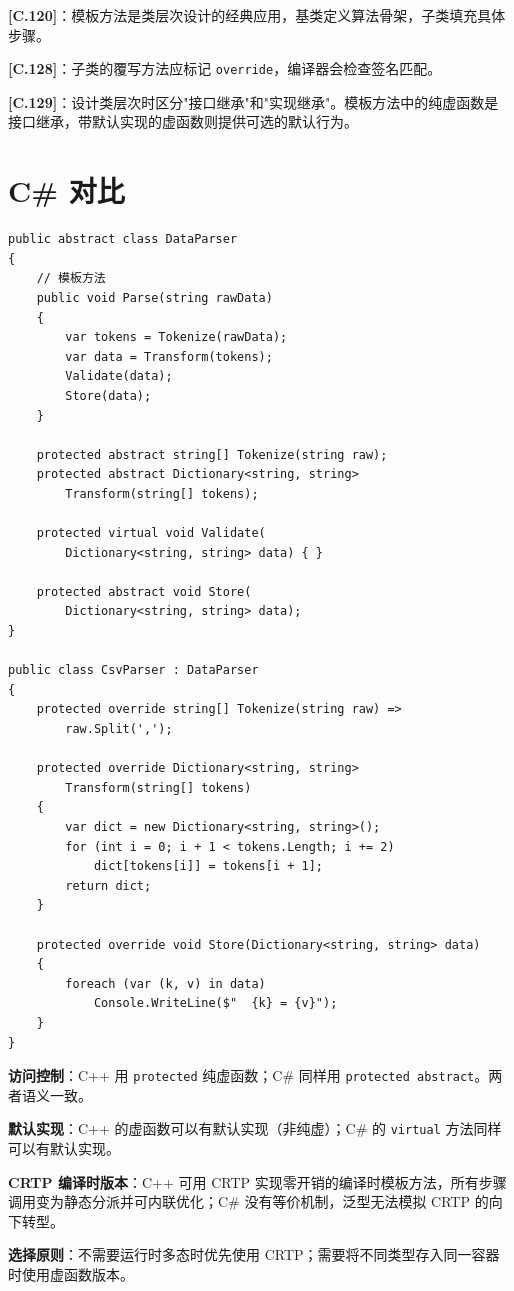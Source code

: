 \documentclass[12pt,a4paper,fontset=fandol]{ctexbook}
\newcommand{\guideref}[1]{\textbf{\textcolor{blue!70!black}{[#1]}}}
\begin{document}
\begin{guideline}
\guideref{C.120}：模板方法是类层次设计的经典应用，基类定义算法骨架，子类填充具体步骤。

\guideref{C.128}：子类的覆写方法应标记 \texttt{override}，编译器会检查签名匹配。

\guideref{C.129}：设计类层次时区分"接口继承"和"实现继承"。模板方法中的纯虚函数是接口继承，带默认实现的虚函数则提供可选的默认行为。
\end{guideline}

\section{C\# 对比}

\begin{lstlisting}[style=csharpstyle, caption={模板方法模式 --- C\# 实现}]
public abstract class DataParser
{
    // 模板方法
    public void Parse(string rawData)
    {
        var tokens = Tokenize(rawData);
        var data = Transform(tokens);
        Validate(data);
        Store(data);
    }

    protected abstract string[] Tokenize(string raw);
    protected abstract Dictionary<string, string>
        Transform(string[] tokens);

    protected virtual void Validate(
        Dictionary<string, string> data) { }

    protected abstract void Store(
        Dictionary<string, string> data);
}

public class CsvParser : DataParser
{
    protected override string[] Tokenize(string raw) =>
        raw.Split(',');

    protected override Dictionary<string, string>
        Transform(string[] tokens)
    {
        var dict = new Dictionary<string, string>();
        for (int i = 0; i + 1 < tokens.Length; i += 2)
            dict[tokens[i]] = tokens[i + 1];
        return dict;
    }

    protected override void Store(Dictionary<string, string> data)
    {
        foreach (var (k, v) in data)
            Console.WriteLine($"  {k} = {v}");
    }
}
\end{lstlisting}

\begin{compare}
\textbf{访问控制}：C++ 用 \texttt{protected} 纯虚函数；C\# 同样用 \texttt{protected abstract}。两者语义一致。

\textbf{默认实现}：C++ 的虚函数可以有默认实现（非纯虚）；C\# 的 \texttt{virtual} 方法同样可以有默认实现。

\textbf{CRTP 编译时版本}：C++ 可用 CRTP 实现零开销的编译时模板方法，所有步骤调用变为静态分派并可内联优化；C\# 没有等价机制，泛型无法模拟 CRTP 的向下转型。

\textbf{选择原则}：不需要运行时多态时优先使用 CRTP；需要将不同类型存入同一容器时使用虚函数版本。
\end{compare}
\end{document}
